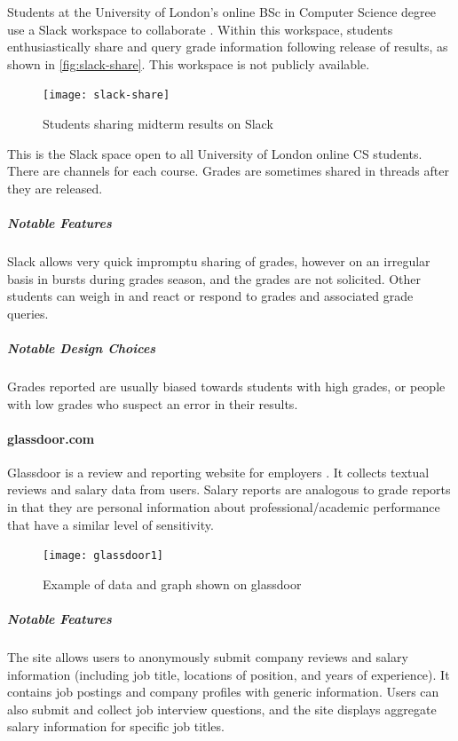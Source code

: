 Students at the University of London's online BSc in Computer Science degree use a Slack workspace to collaborate \cite{slack}. Within this workspace, students enthusiastically share and query grade information following release of results, as shown in \autoref{fig:slack-share}. This workspace is not publicly available.

\begin{figure}[H]
\noindent \texttt{[image: slack-share]}
\centering
\caption{Students sharing midterm results on Slack}
\label{fig:slack-share}
\end{figure}

\noindent This is the Slack space open to all University of London online CS students. There are channels for each course. Grades are sometimes shared in threads after they are released.
\bigskip

\subparagraph{Notable Features}
Slack allows very quick impromptu sharing of grades, however on an irregular basis in bursts during grades season, and the grades are not solicited. Other students can weigh in and react or respond to grades and associated grade queries.

\subparagraph{Notable Design Choices}
Grades reported are usually biased towards students with high grades, or people with low grades who suspect an error in their results.

\paragraph{glassdoor.com}

Glassdoor is a review and reporting website for employers \cite{glassdoor}. It collects textual reviews and salary data from users. Salary reports are analogous to grade reports in that they are personal information about professional/academic performance that have a similar level of sensitivity.

\begin{figure}[H]
\noindent \texttt{[image: glassdoor1]}
\centering
\caption{Example of data and graph shown on glassdoor}
\label{fig:glassdoor-data}
\end{figure}

\subparagraph{Notable Features}
The site allows users to anonymously submit company reviews and salary information (including job title, locations of position, and years of experience). It contains job postings and company profiles with generic information. Users can also submit and collect job interview questions, and the site displays aggregate salary information for specific job titles.

